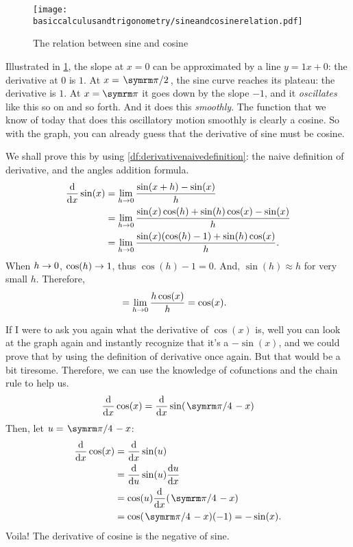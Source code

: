 \begin{figure}[ht]
    \centering
    \texttt{[image: basiccalculusandtrigonometry/sineandcosinerelation.pdf]}
    \caption{The relation between sine and cosine}
    \label{fig:sineandcosinerelation}
\end{figure}

Illustrated in \cref{fig:sineandcosinerelation}, the slope at $x = 0$ can be approximated by a line $y = 1x + 0$: the derivative at $0$ is $1$. At $x = \flatfrac{\cpi}{2}$, the sine curve reaches its plateau: the derivative is $1$. At $x = \cpi$ it goes down by the slope $-1$, and it \emph{oscillates} like this so on and so forth. And it does this \emph{smoothly}. The function that we know of today that does this oscillatory motion smoothly is clearly a cosine. So with the graph, you can already guess that the derivative of sine must be cosine.

We shall prove this by using \cref{df:derivativenaivedefinition}: the naive definition of derivative, and the angles addition formula.
\begin{align*}
    \dv{x}\sin(x) &= \lim_{h \rightarrow 0}\frac{\sin(x + h) - \sin(x)}{h} \\
    &= \lim_{h \rightarrow 0}\frac{\sin(x)\cos(h) + \sin(h)\cos(x) - \sin(x)}{h} \\
    &= \lim_{h \rightarrow 0}\frac{\sin(x)(\cos(h) - 1) + \sin(h)\cos(x)}{h}.
\end{align*}
When $h \rightarrow 0$, $\cos(h) \rightarrow 1$, thus $\cos(h) - 1 = 0$. And, $\sin(h) \approx h$ for very small $h$. Therefore,
\begin{align*}
    &= \lim_{h \rightarrow 0}\frac{h\cos(x)}{h} = \cos(x).
\end{align*}

If I were to ask you again what the derivative of $\cos(x)$ is, well you can look at the graph again and instantly recognize that it's a $-\sin(x)$, and we could prove that by using the definition of derivative once again. But that would be a bit tiresome. Therefore, we can use the knowledge of cofunctions and the chain rule to help us.
\begin{equation}
    \dv{x}\cos(x) = \dv{x}\sin(\flatfrac{\cpi}{4} - x)
\end{equation}
Then, let $u = \flatfrac{\cpi}{4} - x$:
\begin{align*}
    \dv{x}\cos(x) &= \dv{x}\sin(u) \\
    &= \dv{u}\sin(u)\dv{u}{x} \\
    &= \cos(u)\dv{x}(\flatfrac{\cpi}{4} - x) \\
    &= \cos(\flatfrac{\cpi}{4} - x)(-1) = -\sin(x).
\end{align*}
Voila! The derivative of cosine is the negative of sine.

